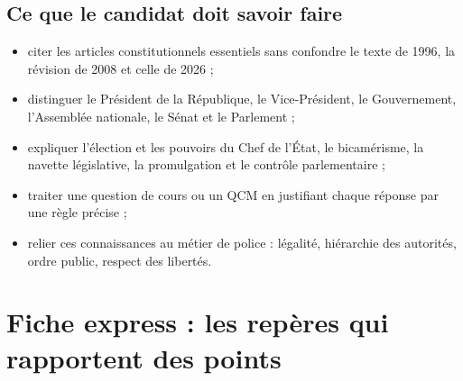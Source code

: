 \documentclass[11pt,a4paper,oneside]{report}
\begin{document}
\section{Ce que le candidat doit savoir faire}
\begin{itemize}
  \item citer les articles constitutionnels essentiels sans confondre le texte de 1996, la révision de 2008 et celle de 2026 ;
  \item distinguer le Président de la République, le Vice-Président, le Gouvernement, l'Assemblée nationale, le Sénat et le Parlement ;
  \item expliquer l'élection et les pouvoirs du Chef de l'État, le bicamérisme, la navette législative, la promulgation et le contrôle parlementaire ;
  \item traiter une question de cours ou un QCM en justifiant chaque réponse par une règle précise ;
  \item relier ces connaissances au métier de police : légalité, hiérarchie des autorités, ordre public, respect des libertés.
\end{itemize}
\chapter{Fiche express : les repères qui rapportent des points}
\end{document}
